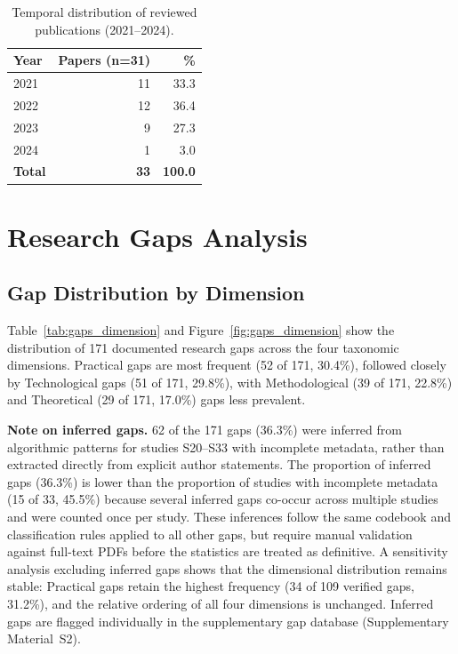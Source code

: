 \documentclass[review,3p,times]{elsarticle}
\begin{document}
\begin{itemize}
{\begin{table}[htbp]
\centering
\caption{Temporal distribution of reviewed publications (2021--2024).}
\label{tab:temporal}
\begin{tabular}{lrr}
\toprule
\textbf{Year} & \textbf{Papers (n=31)} & \textbf{\%} \\
\midrule
2021 & 11 & 33.3 \\
2022 & 12 & 36.4 \\
2023 & 9  & 27.3  \\
2024 & 1  & 3.0   \\
\midrule
\textbf{Total} & \textbf{33} & \textbf{100.0} \\
\bottomrule
\end{tabular}
\end{table}

\section{Research Gaps Analysis}

\subsection{Gap Distribution by Dimension}

Table~\ref{tab:gaps_dimension} and Figure~\ref{fig:gaps_dimension} show the distribution of 171 documented research gaps across the four taxonomic dimensions. Practical gaps are most frequent (52 of 171, 30.4\%), followed closely by Technological gaps (51 of 171, 29.8\%), with Methodological (39 of 171, 22.8\%) and Theoretical (29 of 171, 17.0\%) gaps less prevalent.

\textbf{Note on inferred gaps.} 62 of the 171 gaps (36.3\%) were inferred from algorithmic patterns for studies S20--S33 with incomplete metadata, rather than extracted directly from explicit author statements. The proportion of inferred gaps (36.3\%) is lower than the proportion of studies with incomplete metadata (15 of 33, 45.5\%) because several inferred gaps co-occur across multiple studies and were counted once per study. These inferences follow the same codebook and classification rules applied to all other gaps, but require manual validation against full-text PDFs before the statistics are treated as definitive. A sensitivity analysis excluding inferred gaps shows that the dimensional distribution remains stable: Practical gaps retain the highest frequency (34 of 109 verified gaps, 31.2\%), and the relative ordering of all four dimensions is unchanged. Inferred gaps are flagged individually in the supplementary gap database (Supplementary Material~S2).

}
\end{itemize}
\end{document}

